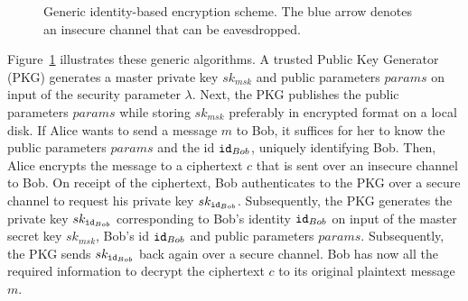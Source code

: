\begin{figure}[ht]
\begin{center}
{
    }
    \end{center}
    \caption{Generic identity-based encryption scheme. The blue arrow denotes an insecure channel that can be eavesdropped.}
    \label{fig:generic_ibe_scheme}
\end{figure}

Figure~\ref{fig:generic_ibe_scheme} illustrates these generic algorithms. A trusted Public Key Generator (PKG) generates a master private key $sk_{msk}$ and public parameters $params$ on input of the security parameter $\lambda$. Next, the PKG publishes the public parameters $params$ while storing $sk_{msk}$ preferably in encrypted format on a local disk. If Alice wants to send a message $m$ to Bob, it suffices for her to know the public parameters $params$ and the id $\mathtt{id}_{Bob}$, uniquely identifying Bob. Then, Alice encrypts the message to a ciphertext $c$ that is sent over an insecure channel to Bob. On receipt of the ciphertext, Bob authenticates to the PKG over a secure channel to request his private key $sk_{\mathtt{id}_{Bob}}$. Subsequently, the PKG generates the private key $sk_{\mathtt{id}_{Bob}}$ corresponding to Bob's identity $\mathtt{id}_{Bob}$ on input of the master secret key $sk_{msk}$, Bob's id $\mathtt{id}_{Bob}$ and public parameters $params$. Subsequently, the PKG sends $sk_{\mathtt{id}_{Bob}}$ back again over a secure channel. Bob has now all the required information to decrypt the ciphertext $c$ to its original plaintext message $m$.


